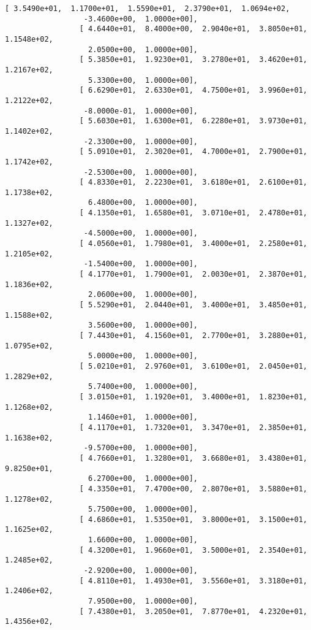 \documentclass[11pt]{article}
\begin{document}
\begin{Verbatim}[commandchars=\\\{\}]
                 [ 3.5490e+01,  1.1700e+01,  1.5590e+01,  2.3790e+01,  1.0694e+02,
                  -3.4600e+00,  1.0000e+00],
                 [ 4.6440e+01,  8.4000e+00,  2.9040e+01,  3.8050e+01,  1.1548e+02,
                   2.0500e+00,  1.0000e+00],
                 [ 5.3850e+01,  1.9230e+01,  3.2780e+01,  3.4620e+01,  1.2167e+02,
                   5.3300e+00,  1.0000e+00],
                 [ 6.6290e+01,  2.6330e+01,  4.7500e+01,  3.9960e+01,  1.2122e+02,
                  -8.0000e-01,  1.0000e+00],
                 [ 5.6030e+01,  1.6300e+01,  6.2280e+01,  3.9730e+01,  1.1402e+02,
                  -2.3300e+00,  1.0000e+00],
                 [ 5.0910e+01,  2.3020e+01,  4.7000e+01,  2.7900e+01,  1.1742e+02,
                  -2.5300e+00,  1.0000e+00],
                 [ 4.8330e+01,  2.2230e+01,  3.6180e+01,  2.6100e+01,  1.1738e+02,
                   6.4800e+00,  1.0000e+00],
                 [ 4.1350e+01,  1.6580e+01,  3.0710e+01,  2.4780e+01,  1.1327e+02,
                  -4.5000e+00,  1.0000e+00],
                 [ 4.0560e+01,  1.7980e+01,  3.4000e+01,  2.2580e+01,  1.2105e+02,
                  -1.5400e+00,  1.0000e+00],
                 [ 4.1770e+01,  1.7900e+01,  2.0030e+01,  2.3870e+01,  1.1836e+02,
                   2.0600e+00,  1.0000e+00],
                 [ 5.5290e+01,  2.0440e+01,  3.4000e+01,  3.4850e+01,  1.1588e+02,
                   3.5600e+00,  1.0000e+00],
                 [ 7.4430e+01,  4.1560e+01,  2.7700e+01,  3.2880e+01,  1.0795e+02,
                   5.0000e+00,  1.0000e+00],
                 [ 5.0210e+01,  2.9760e+01,  3.6100e+01,  2.0450e+01,  1.2829e+02,
                   5.7400e+00,  1.0000e+00],
                 [ 3.0150e+01,  1.1920e+01,  3.4000e+01,  1.8230e+01,  1.1268e+02,
                   1.1460e+01,  1.0000e+00],
                 [ 4.1170e+01,  1.7320e+01,  3.3470e+01,  2.3850e+01,  1.1638e+02,
                  -9.5700e+00,  1.0000e+00],
                 [ 4.7660e+01,  1.3280e+01,  3.6680e+01,  3.4380e+01,  9.8250e+01,
                   6.2700e+00,  1.0000e+00],
                 [ 4.3350e+01,  7.4700e+00,  2.8070e+01,  3.5880e+01,  1.1278e+02,
                   5.7500e+00,  1.0000e+00],
                 [ 4.6860e+01,  1.5350e+01,  3.8000e+01,  3.1500e+01,  1.1625e+02,
                   1.6600e+00,  1.0000e+00],
                 [ 4.3200e+01,  1.9660e+01,  3.5000e+01,  2.3540e+01,  1.2485e+02,
                  -2.9200e+00,  1.0000e+00],
                 [ 4.8110e+01,  1.4930e+01,  3.5560e+01,  3.3180e+01,  1.2406e+02,
                   7.9500e+00,  1.0000e+00],
                 [ 7.4380e+01,  3.2050e+01,  7.8770e+01,  4.2320e+01,  1.4356e+02,

\end{Verbatim}
\end{document}
